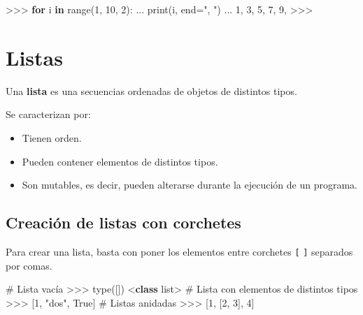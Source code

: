 \documentclass[
  spanish,
  a4paper,
]{scrreport}
\newenvironment{Shaded}{\begin{snugshade}}{\end{snugshade}}
\newcommand{\BuiltInTok}[1]{\textcolor[rgb]{0.00,0.23,0.31}{#1}}
\newcommand{\CommentTok}[1]{\textcolor[rgb]{0.37,0.37,0.37}{#1}}
\newcommand{\ControlFlowTok}[1]{\textcolor[rgb]{0.00,0.23,0.31}{\textbf{#1}}}
\newcommand{\DecValTok}[1]{\textcolor[rgb]{0.68,0.00,0.00}{#1}}
\newcommand{\KeywordTok}[1]{\textcolor[rgb]{0.00,0.23,0.31}{\textbf{#1}}}
\newcommand{\NormalTok}[1]{\textcolor[rgb]{0.00,0.23,0.31}{#1}}
\newcommand{\OperatorTok}[1]{\textcolor[rgb]{0.37,0.37,0.37}{#1}}
\newcommand{\StringTok}[1]{\textcolor[rgb]{0.13,0.47,0.30}{#1}}
\newcommand{\VariableTok}[1]{\textcolor[rgb]{0.07,0.07,0.07}{#1}}
\providecommand{\tightlist}{%
  \setlength{\itemsep}{0pt}\setlength{\parskip}{0pt}}
\begin{document}
\begin{Shaded}
\begin{Highlighting}[]
\OperatorTok{\textgreater{}\textgreater{}\textgreater{}} \ControlFlowTok{for}\NormalTok{ i }\KeywordTok{in} \BuiltInTok{range}\NormalTok{(}\DecValTok{1}\NormalTok{, }\DecValTok{10}\NormalTok{, }\DecValTok{2}\NormalTok{):}
\NormalTok{...     }\BuiltInTok{print}\NormalTok{(i, end}\OperatorTok{=}\StringTok{", "}\NormalTok{)}
\NormalTok{...}
\DecValTok{1}\NormalTok{, }\DecValTok{3}\NormalTok{, }\DecValTok{5}\NormalTok{, }\DecValTok{7}\NormalTok{, }\DecValTok{9}\NormalTok{, }\OperatorTok{\textgreater{}\textgreater{}\textgreater{}}
\end{Highlighting}
\end{Shaded}


\chapter{Listas}\label{listas}

Una \textbf{lista} es una secuencias ordenadas de objetos de distintos
tipos.

Se caracterizan por:

\begin{itemize}
\tightlist
\item
  Tienen orden.
\item
  Pueden contener elementos de distintos tipos.
\item
  Son mutables, es decir, pueden alterarse durante la ejecución de un
  programa.
\end{itemize}

\section{Creación de listas con
corchetes}\label{creaciuxf3n-de-listas-con-corchetes}

Para crear una lista, basta con poner los elementos entre corchetes
\texttt{{[}} \texttt{{]}} separados por comas.

\begin{Shaded}
\begin{Highlighting}[]
\CommentTok{\# Lista vacía}
\OperatorTok{\textgreater{}\textgreater{}\textgreater{}} \BuiltInTok{type}\NormalTok{([])}
\OperatorTok{\textless{}}\KeywordTok{class} \StringTok{\textquotesingle{}list\textquotesingle{}}\OperatorTok{\textgreater{}}
\CommentTok{\# Lista con elementos de distintos tipos}
\OperatorTok{\textgreater{}\textgreater{}\textgreater{}}\NormalTok{ [}\DecValTok{1}\NormalTok{, }\StringTok{"dos"}\NormalTok{, }\VariableTok{True}\NormalTok{]}
\CommentTok{\# Listas anidadas}
\OperatorTok{\textgreater{}\textgreater{}\textgreater{}}\NormalTok{ [}\DecValTok{1}\NormalTok{, [}\DecValTok{2}\NormalTok{, }\DecValTok{3}\NormalTok{], }\DecValTok{4}\NormalTok{]}
\end{Highlighting}
\end{Shaded}
\end{document}
